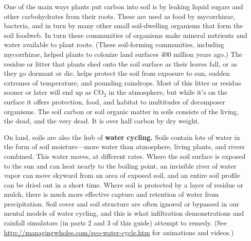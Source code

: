 \documentclass[11pt,letterpaper,twoside,onecolumn]{memoir}
\begin{document}
One of the main ways plants put carbon into soil is by leaking liquid sugars and other carbohydrates from their roots. These are used as food by mycorrhizae, bacteria, and in turn by many other small soil-dwelling organisms that form the soil foodweb. In turn these communities of organisms make mineral nutrients and water available to plant roots. (These soil-forming communities, including mycorrhizae, helped plants to colonize land surfaces 400 million years ago.) The residue or litter that plants shed onto the soil surface as their leaves fall, or as they go dormant or die, helps protect the soil from exposure to sun, sudden extremes of temperature, and pounding raindrops. Most of this litter or residue sooner or later will end up as CO$_{2}$ in the atmosphere, but while it's on the surface it offers protection, food, and habitat to multitudes of decomposer organisms. The soil carbon or soil organic matter in soils consists of the living, the dead, and the very dead. It is over half carbon by dry weight. 

\begin{figure}
\end{figure}

On land, soils are also the hub of \textbf{water cycling.} Soils contain lots of water in the form of soil moisture---more water than atmosphere, living plants, and rivers combined. This water moves, at different rates. Where the soil surface is exposed to the sun and can heat nearly to the boiling point, an invisible river of water vapor can move skyward from an area of exposed soil, and an entire soil profile can be dried out in a short time. Where soil is protected by a layer of residue or mulch, there is much more effective capture and retention of water from precipitation. Soil cover and soil structure are often ignored or bypassed in our mental models of water cycling, and this is what infiltration demonstrations and rainfall simulators (in parts 2 and 3 of this guide) attempt to remedy. (See \url{http://managingwholes.com/eco-water-cycle.htm} for animations and videos.)
\end{document}
